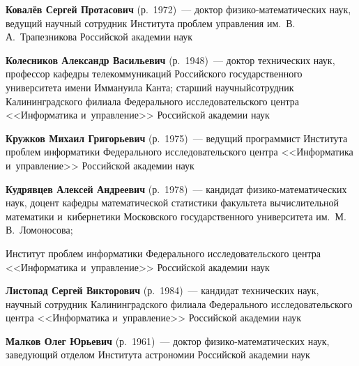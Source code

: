 \begin{multicols}{2}
\vspace*{1pt}

 
\noindent
\textbf{Ковалёв Сергей Протасович} (р.\ 1972)~--- 
доктор фи\-зи\-ко-ма\-те\-ма\-ти\-че\-ских наук, ведущий научный 
сотрудник Института проб\-лем управ\-ле\-ния им.\ В.\,А.~Трапезникова
Российской академии наук 

\vspace*{1pt}

\noindent
\textbf{Колесников Александр Васильевич} (р.\ 1948)~---
доктор технических наук, профессор кафедры телекоммуникаций Российского 
государственного университета имени Иммануила Канта; 
старший научный\linebreak сотрудник Калининградского филиала Федерального исследовательского 
центра <<Информатика и~управ\-ле\-ние>> Российской академии наук

\vspace*{1pt}

\noindent
\textbf{Кружков Михаил Григорьевич} (р.\ 1975)~---
ведущий программист Института проб\-лем 
информатики Федерального исследовательского центра <<Информатика и~управ\-ление>>
Российской академии наук

\vspace*{1pt}
 
 \noindent
\textbf{Кудрявцев Алексей Андреевич} (р.\ 1978)~---
кандидат фи\-зи\-ко-ма\-те\-ма\-ти\-че\-ских наук, доцент кафедры математической 
статистики факультета вычислительной математики и~кибернетики Московского 
государственного университета им.\ М.\,В.~Ломоносова;\linebreak\vspace*{-12pt}

\pagebreak

\noindent
 Институт проб\-лем 
информатики Федерального исследовательского центра <<Информатика и~управ\-ле\-ние>> 
Российской академии наук

\vspace*{1pt}

\noindent
\textbf{Листопад Сергей Викторович} (р.\ 1984)~---
кандидат технических наук, научный сотрудник Калининградского филиала Федерального 
исследовательского центра <<Информатика и~управ\-ле\-ние>> Российской академии наук

\vspace*{1pt}

\noindent
\textbf{Малков Олег Юрьевич} (р.\ 1961)~---
доктор фи\-зи\-ко-ма\-те\-ма\-ти\-че\-ских наук, заведующий отделом Института 
астрономии Российской академии наук 


\end{multicols}
